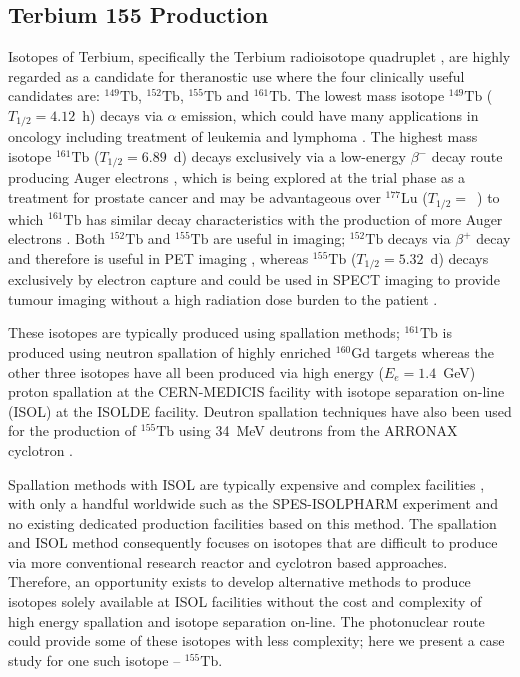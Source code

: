 \subsection{Terbium 155 Production}
Isotopes of Terbium, specifically the Terbium radioisotope quadruplet \cite{muller2012unique}, are highly regarded as a candidate for theranostic use where the four clinically useful candidates are: $^{149}\mathrm{Tb}$, $^{152}\mathrm{Tb}$, $^{155}\mathrm{Tb}$ and $^{161}\mathrm{Tb}$. The lowest mass isotope $^{149}\mathrm{Tb}$ ($T_{1/2} = 4.12$~\si{\hour}) decays via $\alpha$ emission, which could have many applications in oncology \cite{muller2017alpha} including treatment of leukemia and lymphoma \cite{beyer2004targeted}. The highest mass isotope $^{161}\mathrm{Tb}$ ($T_{1/2} = 6.89$~\si{\day}) decays exclusively via a low-energy $\beta^{-}$ decay route producing Auger electrons \cite{muller2012unique}, which is being explored at the trial phase as a treatment for prostate cancer \cite{baum2021first,muller2019terbium} and may be advantageous over $^{177}\mathrm{Lu}$ ($T_{1/2} = $~\si{}) to which $^{161}\mathrm{Tb}$ has similar decay characteristics with the production of more Auger electrons \cite{lehenberger2011low,grunberg2014anti}. Both $^{152}\mathrm{Tb}$ and $^{155}\mathrm{Tb}$ are useful in imaging; $^{152}\mathrm{Tb}$ decays via $\beta^{+}$ decay and therefore is useful in PET imaging \cite{muller2012unique}, whereas $^{155}\mathrm{Tb}$ ($T_{1/2} = 5.32$~\si{\day}) decays exclusively by electron capture and could be used in SPECT imaging to provide tumour imaging without a high radiation dose burden to the patient \cite{muller2012unique}.

These isotopes are typically produced using spallation methods; $^{161}\mathrm{Tb}$ is produced using neutron spallation of highly enriched $^{160}\mathrm{Gd}$ targets \cite{lehenberger2011low} whereas the other three isotopes have all been produced via high energy ($E_{e} = 1.4$~\si{\giga\electronvolt}) proton spallation \cite{muller2012unique} at the CERN-MEDICIS facility \cite{dos2014cern} with isotope separation on-line (ISOL) at the ISOLDE \cite{catherall2017isolde} facility. Deutron spallation techniques have also been used for the production of $^{155}\mathrm{Tb}$ using 34~\si{\mega\electronvolt} deutrons from the ARRONAX cyclotron \cite{duchemin2016deuteron}. 

Spallation methods with ISOL are typically expensive and complex facilities \cite{duchemin2016deuteron}, with only a handful worldwide such as the SPES-ISOLPHARM experiment \cite{andrighetto2019isolpharm} and no existing dedicated production facilities based on this method. The spallation and ISOL method consequently focuses on isotopes that are difficult to produce via more conventional research reactor and cyclotron based approaches. Therefore, an opportunity exists to develop alternative methods to produce isotopes solely available at ISOL facilities without the cost and complexity of high energy spallation and isotope separation on-line. The photonuclear route could provide some of these isotopes with less complexity; here we present a case study for one such isotope -- $^{155}\mathrm{Tb}$.

